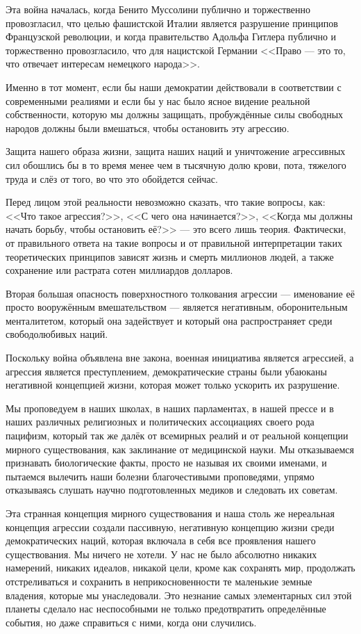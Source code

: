 Эта война началась, когда Бенито Муссолини публично и торжественно провозгласил, что целью фашистской Италии является разрушение принципов Французской революции, и когда правительство Адольфа Гитлера публично и торжественно провозгласило, что для нацистской Германии <<Право — это то, что отвечает интересам немецкого народа>>.

Именно в тот момент, если бы наши демократии действовали в соответствии с современными реалиями и если бы у нас было ясное видение реальной собственности, которую мы должны защищать, пробуждённые силы свободных народов должны были вмешаться, чтобы остановить эту агрессию.
 
Защита нашего образа жизни, защита наших наций и уничтожение агрессивных сил обошлись бы в то время менее чем в тысячную долю крови, пота, тяжелого труда и слёз от того, во что это обойдется сейчас.

Перед лицом этой реальности невозможно сказать, что такие вопросы, как: <<Что такое агрессия?>>, <<С чего она начинается?>>, <<Когда мы должны начать борьбу, чтобы остановить её?>> — это всего лишь теория. Фактически, от правильного ответа на такие вопросы и от правильной интерпретации таких теоретических принципов зависят жизнь и смерть миллионов людей, а также сохранение или растрата сотен миллиардов долларов.
 
Вторая большая опасность поверхностного толкования агрессии — именование её просто вооружённым вмешательством — является негативным, оборонительным менталитетом, который она задействует и который она распространяет среди свободолюбивых наций.

Поскольку война объявлена вне закона, военная инициатива является агрессией, а агрессия является преступлением, демократические страны были убаюканы негативной концепцией жизни, которая может только ускорить их разрушение.
 
Мы проповедуем в наших школах, в наших парламентах, в нашей прессе и в наших различных религиозных и политических ассоциациях своего рода пацифизм, который так же далёк от всемирных реалий и от реальной концепции мирного существования, как заклинание от медицинской науки. Мы отказываемся признавать биологические факты, просто не называя их своими именами, и пытаемся вылечить наши болезни благочестивыми проповедями, упрямо отказываясь слушать научно подготовленных медиков и следовать их советам.

Эта странная концепция мирного существования и наша столь же нереальная концепция агрессии создали пассивную, негативную концепцию жизни среди демократических наций, которая включала в себя все проявления нашего существования. Мы ничего не хотели. У нас не было абсолютно никаких намерений, никаких идеалов, никакой цели, кроме как сохранять мир, продолжать отстреливаться и сохранить в неприкосновенности те маленькие земные владения, которые мы унаследовали. Это незнание самых элементарных сил этой планеты сделало нас неспособными не только предотвратить определённые события, но даже справиться с ними, когда они случились.
 
